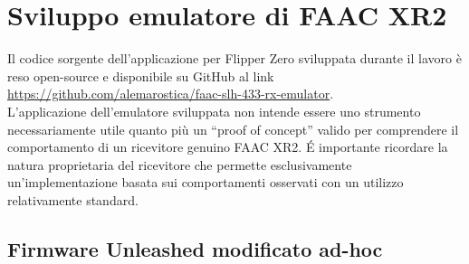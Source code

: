 \chapter{Sviluppo emulatore di FAAC XR2}
\label{cha:development}

Il codice sorgente dell'applicazione per Flipper Zero sviluppata durante il lavoro è reso open-source e disponibile su GitHub al link \url{https://github.com/alemarostica/faac-slh-433-rx-emulator}.\\
L’applicazione dell’emulatore sviluppata non intende essere uno strumento necessariamente utile quanto più un “proof of concept” valido per comprendere il comportamento di un ricevitore genuino FAAC XR2. É importante ricordare la natura proprietaria del ricevitore che permette esclusivamente un’implementazione basata sui comportamenti osservati con un utilizzo relativamente standard.

\section{Firmware Unleashed modificato ad-hoc}
\label{sec:unleashed_mod}

